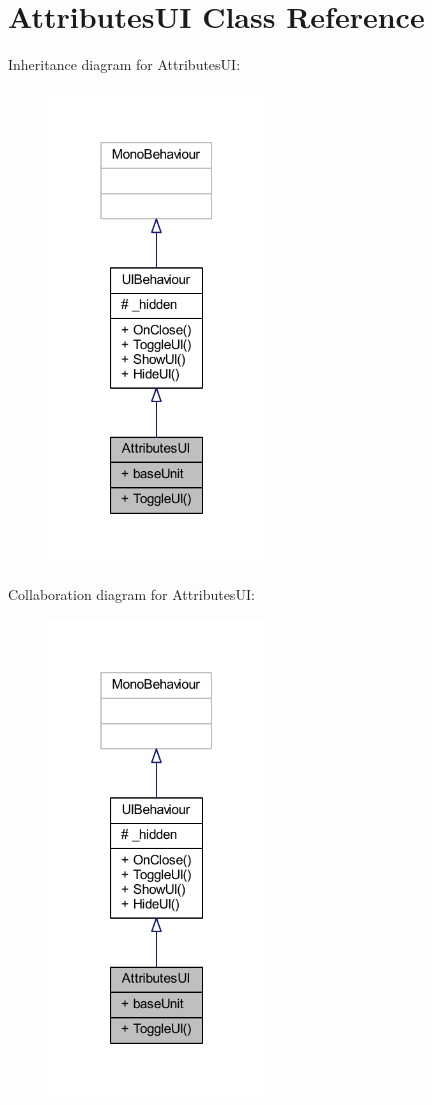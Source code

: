 \hypertarget{class_attributes_u_i}{}\section{Attributes\+UI Class Reference}
\label{class_attributes_u_i}


Inheritance diagram for Attributes\+UI\+:
\nopagebreak
\begin{figure}[H]
\begin{center}
\leavevmode
\includegraphics[width=163pt]{class_attributes_u_i__inherit__graph}
\end{center}
\end{figure}


Collaboration diagram for Attributes\+UI\+:
\nopagebreak
\begin{figure}[H]
\begin{center}
\leavevmode
\includegraphics[width=163pt]{class_attributes_u_i__coll__graph}
\end{center}
\end{figure}
